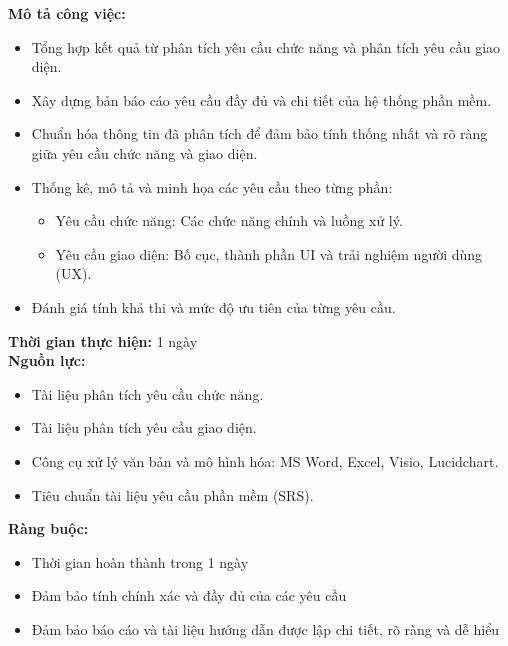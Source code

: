 {\begin{minipage}{\textwidth}
\begin{itemize}
    \end{itemize}
    \vspace{0.5cm}
    \noindent \textbf{Mô tả công việc:}
    \begin{itemize}
        \item Tổng hợp kết quả từ phân tích yêu cầu chức năng và phân tích yêu cầu giao diện.
        \item Xây dựng bản báo cáo yêu cầu đầy đủ và chi tiết của hệ thống phần mềm.
        \item Chuẩn hóa thông tin đã phân tích để đảm bảo tính thống nhất và rõ ràng giữa yêu cầu chức năng và giao diện.
        \item Thống kê, mô tả và minh họa các yêu cầu theo từng phần:
        \begin{itemize}
            \item Yêu cầu chức năng: Các chức năng chính và luồng xử lý.
            \item Yêu cầu giao diện: Bố cục, thành phần UI và trải nghiệm người dùng (UX).
        \end{itemize}
        \item Đánh giá tính khả thi và mức độ ưu tiên của từng yêu cầu.
    \end{itemize}
    \vspace{0.5cm}
    \noindent \textbf{Thời gian thực hiện:} 1 ngày \\
    \noindent \textbf{Nguồn lực:}
    \begin{itemize}
        \item Tài liệu phân tích yêu cầu chức năng.
        \item Tài liệu phân tích yêu cầu giao diện.
        \item Công cụ xử lý văn bản và mô hình hóa: MS Word, Excel, Visio, Lucidchart.
        \item Tiêu chuẩn tài liệu yêu cầu phần mềm (SRS).
    \end{itemize}
    \vspace{0.5cm}
    \noindent \textbf{Ràng buộc:}
    \begin{itemize}
        \item Thời gian hoàn thành trong 1 ngày
        \item Đảm bảo tính chính xác và đầy đủ của các yêu cầu
        \item Đảm bảo báo cáo và tài liệu hướng dẫn được lập chi tiết, rõ ràng và dễ hiểu
    \end{itemize}
    \end{minipage}
}

